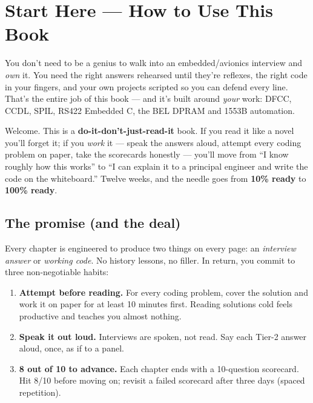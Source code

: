 \chapter*{Start Here --- How to Use This Book}

\begin{keyidea}
You don't need to be a genius to walk into an embedded/avionics interview and
\emph{own} it. You need the right answers rehearsed until they're reflexes, the
right code in your fingers, and your own projects scripted so you can defend
every line. That's the entire job of this book --- and it's built around
\emph{your} work: DFCC, CCDL, SPIL, RS422 Embedded C, the BEL DPRAM and 1553B
automation.
\end{keyidea}

\noindent Welcome. This is a \textbf{do-it-don't-just-read-it} book. If you read
it like a novel you'll forget it; if you \emph{work} it --- speak the answers
aloud, attempt every coding problem on paper, take the scorecards honestly ---
you'll move from ``I know roughly how this works'' to ``I can explain it to a
principal engineer and write the code on the whiteboard.'' Twelve weeks, and the
needle goes from \textbf{10\% ready} to \textbf{100\% ready}.

\section*{The promise (and the deal)}
Every chapter is engineered to produce two things on every page: an
\emph{interview answer} or \emph{working code}. No history lessons, no filler.
In return, you commit to three non-negotiable habits:

\begin{enumerate}
\item \textbf{Attempt before reading.} For every coding problem, cover the
  solution and work it on paper for at least 10 minutes first. Reading solutions
  cold feels productive and teaches you almost nothing.
\item \textbf{Speak it out loud.} Interviews are spoken, not read. Say each
  Tier-2 answer aloud, once, as if to a panel.
\item \textbf{8 out of 10 to advance.} Each chapter ends with a 10-question
  scorecard. Hit 8/10 before moving on; revisit a failed scorecard after three
  days (spaced repetition).
\end{enumerate}

